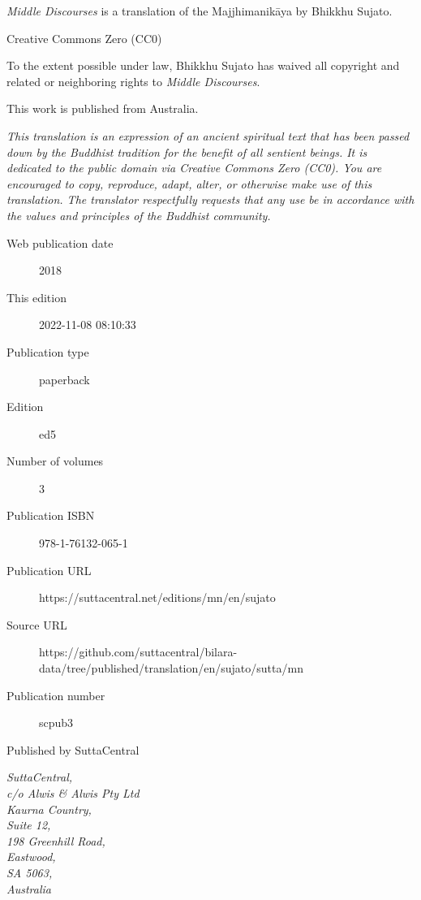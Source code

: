 \documentclass[12pt,openany]{book}%
\begin{document}
\begin{footnotesize}

\textit{Middle Discourses} is a translation of the Majjhimanikāya by Bhikkhu Sujato.

\medskip

Creative Commons Zero (CC0)

To the extent possible under law, Bhikkhu Sujato has waived all copyright and related or neighboring rights to \textit{Middle Discourses}.

\medskip

This work is published from Australia.

\begin{center}
\textit{This translation is an expression of an ancient spiritual text that has been passed down by the Buddhist tradition for the benefit of all sentient beings. It is dedicated to the public domain via Creative Commons Zero (CC0). You are encouraged to copy, reproduce, adapt, alter, or otherwise make use of this translation. The translator respectfully requests that any use be in accordance with the values and principles of the Buddhist community.}
\end{center}

\medskip

\begin{description}
    \item[Web publication date] 2018
    \item[This edition] 2022-11-08 08:10:33
    \item[Publication type] paperback
    \item[Edition] ed5
    \item[Number of volumes] 3
    \item[Publication ISBN] 978-1-76132-065-1
    \item[Publication URL] https://suttacentral.net/editions/mn/en/sujato
    \item[Source URL] https://github.com/suttacentral/bilara-data/tree/published/translation/en/sujato/sutta/mn
    \item[Publication number] scpub3
\end{description}

\medskip

Published by SuttaCentral

\medskip

\textit{SuttaCentral,\\
c/o Alwis \& Alwis Pty Ltd\\
Kaurna Country,\\
Suite 12,\\
198 Greenhill Road,\\
Eastwood,\\
SA 5063,\\
Australia}

\end{footnotesize}
\end{document}
